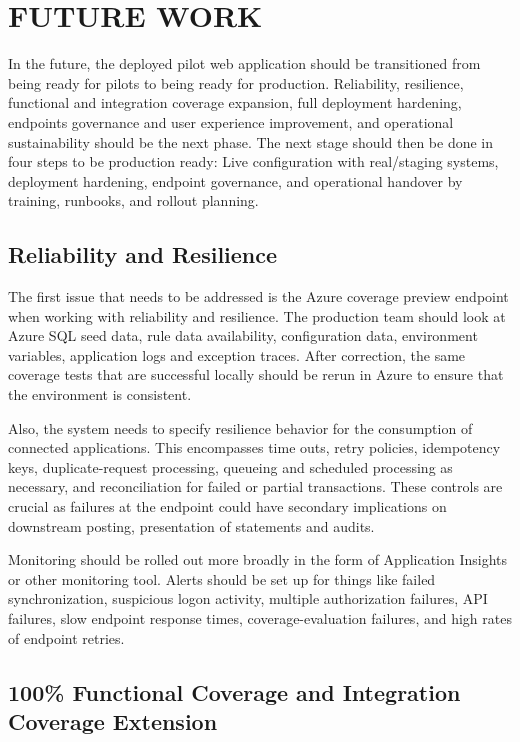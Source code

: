 \section{FUTURE WORK}

In the future, the deployed pilot web application should be transitioned from being ready for pilots to being ready for production. Reliability, resilience, functional and integration coverage expansion, full deployment hardening, endpoints governance and user experience improvement, and operational sustainability should be the next phase. The next stage should then be done in four steps to be production ready: Live configuration with real/staging systems, deployment hardening, endpoint governance, and operational handover by training, runbooks, and rollout planning.

\subsection{Reliability and Resilience}

The first issue that needs to be addressed is the Azure coverage preview endpoint when working with reliability and resilience. The production team should look at Azure SQL seed data, rule data availability, configuration data, environment variables, application logs and exception traces. After correction, the same coverage tests that are successful locally should be rerun in Azure to ensure that the environment is consistent.

Also, the system needs to specify resilience behavior for the consumption of connected applications. This encompasses time outs, retry policies, idempotency keys, duplicate-request processing, queueing and scheduled processing as necessary, and reconciliation for failed or partial transactions. These controls are crucial as failures at the endpoint could have secondary implications on downstream posting, presentation of statements and audits.

Monitoring should be rolled out more broadly in the form of Application Insights or other monitoring tool. Alerts should be set up for things like failed synchronization, suspicious logon activity, multiple authorization failures, API failures, slow endpoint response times, coverage-evaluation failures, and high rates of endpoint retries.

\subsection{100\% Functional Coverage and Integration Coverage Extension}

